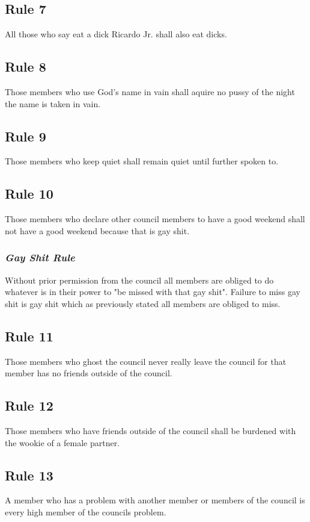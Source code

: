\documentclass[]{article}
\begin{document}
\subsection{Rule 7}
All those who say eat a dick Ricardo Jr. shall also eat dicks.

\subsection{Rule 8}
Those members who use God's name in vain shall aquire no pussy of the night the name is taken in vain.

\subsection{Rule 9}
Those members who keep quiet shall remain quiet until further spoken to.

\subsection{Rule 10}
Those members who declare other council members to have a good weekend shall not have a good weekend because that is gay shit.
\subsubsection{\textit{Gay Shit Rule}}
Without prior permission from the council all members are obliged to do whatever is in their power to "be missed with that gay shit". Failure to miss gay shit is gay shit which as previously stated all members are obliged to miss.

\subsection{Rule 11}
Those members who ghost the council never really leave the council for that member has no friends outside of the council.

\subsection{Rule 12}
Those members who have friends outside of the council shall be burdened with the wookie of a female partner.

\subsection{Rule 13}
A member who has a problem with another member or members of the council is every high member of the councils problem.
\end{document}
